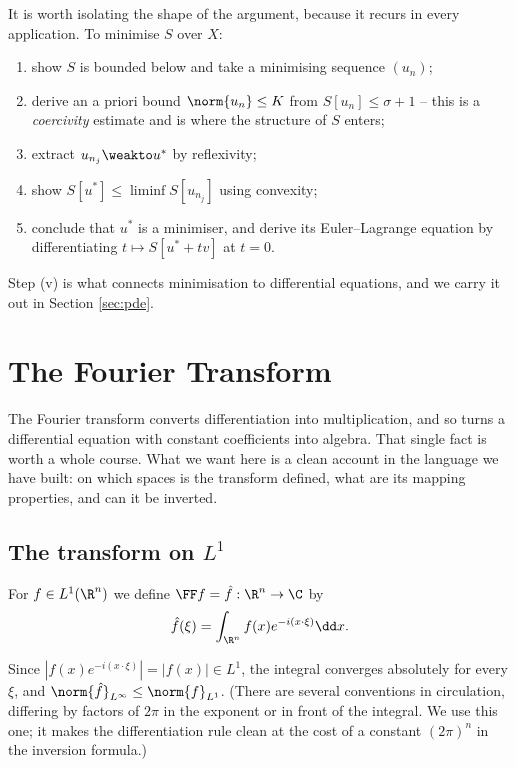 \begin{remark}
	It is worth isolating the shape of the argument, because it recurs in every application. To minimise $S$ over $X$:
	\begin{enumerate}[label=(\roman*)]
		\item show $S$ is bounded below and take a minimising sequence $(u_n)$;
		\item derive an a priori bound $\norm{u_n}\le K$ from $S[u_n]\le \sigma + 1$ -- this is a \emph{coercivity} estimate and is where the structure of $S$ enters;
		\item extract $u_{n_j}\weakto u^*$ by reflexivity;
		\item show $S[u^*]\le\liminf S[u_{n_j}]$ using convexity;
		\item conclude that $u^*$ is a minimiser, and derive its Euler--Lagrange equation by differentiating $t \mapsto S[u^*+tv]$ at $t=0$.
	\end{enumerate}
	Step (v) is what connects minimisation to differential equations, and we carry it out in Section \ref{sec:pde}.
\end{remark}

\section{The Fourier Transform}\label{sec:fourier}

The Fourier transform converts differentiation into multiplication, and so turns a differential equation with constant coefficients into algebra. That single fact is worth a whole course. What we want here is a clean account in the language we have built: on which spaces is the transform defined, what are its mapping properties, and can it be inverted.

\subsection{The transform on \texorpdfstring{$L^1$}{L1}}

\begin{definition}
	For $f \in L^1(\R^n)$ we define $\FF f = \hat f : \R^n \to \C$ by
	$$\hat f (\xi) = \int_{\R^n} f(x) e^{-i (x\cdot\xi)}\dd x.$$
\end{definition}

Since $|f(x)e^{-i(x\cdot\xi)}| = |f(x)| \in L^1$, the integral converges absolutely for every $\xi$, and $\norm{\hat f}_{L^\infty}\le \norm{f}_{L^1}$. (There are several conventions in circulation, differing by factors of $2\pi$ in the exponent or in front of the integral. We use this one; it makes the differentiation rule clean at the cost of a constant $(2\pi)^n$ in the inversion formula.)

